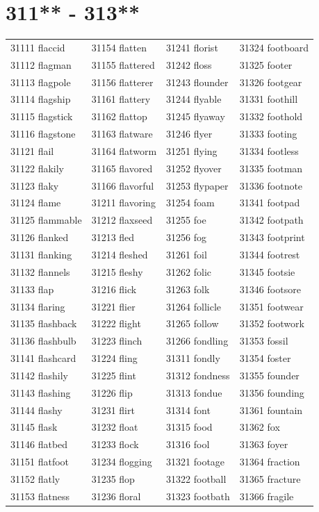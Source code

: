 \documentclass[10pt, oneside]{book}
\begin{document}
\begin{table}
	\centering
	\section*{311** - 313**}
	\begin{tabular}{l l l l}
31111 flaccid &31154 flatten &31241 florist &31324 footboard\\
31112 flagman &31155 flattered &31242 floss &31325 footer\\
31113 flagpole &31156 flatterer &31243 flounder &31326 footgear\\
31114 flagship &31161 flattery &31244 flyable &31331 foothill\\
31115 flagstick &31162 flattop &31245 flyaway &31332 foothold\\
31116 flagstone &31163 flatware &31246 flyer &31333 footing\\
31121 flail &31164 flatworm &31251 flying &31334 footless\\
31122 flakily &31165 flavored &31252 flyover &31335 footman\\
31123 flaky &31166 flavorful &31253 flypaper &31336 footnote\\
31124 flame &31211 flavoring &31254 foam &31341 footpad\\
31125 flammable &31212 flaxseed &31255 foe &31342 footpath\\
31126 flanked &31213 fled &31256 fog &31343 footprint\\
31131 flanking &31214 fleshed &31261 foil &31344 footrest\\
31132 flannels &31215 fleshy &31262 folic &31345 footsie\\
31133 flap &31216 flick &31263 folk &31346 footsore\\
31134 flaring &31221 flier &31264 follicle &31351 footwear\\
31135 flashback &31222 flight &31265 follow &31352 footwork\\
31136 flashbulb &31223 flinch &31266 fondling &31353 fossil\\
31141 flashcard &31224 fling &31311 fondly &31354 foster\\
31142 flashily &31225 flint &31312 fondness &31355 founder\\
31143 flashing &31226 flip &31313 fondue &31356 founding\\
31144 flashy &31231 flirt &31314 font &31361 fountain\\
31145 flask &31232 float &31315 food &31362 fox\\
31146 flatbed &31233 flock &31316 fool &31363 foyer\\
31151 flatfoot &31234 flogging &31321 footage &31364 fraction\\
31152 flatly &31235 flop &31322 football &31365 fracture\\
31153 flatness &31236 floral &31323 footbath &31366 fragile\\
	\end{tabular}
 \end{table}
\clearpage
\end{document}
